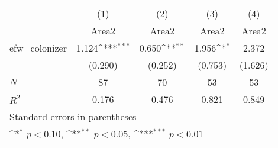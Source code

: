 {
\def\sym#1{\ifmmode^{#1}\else\(^{#1}\)\fi}
\begin{tabular}{l*{4}{c}}
\hline\hline
            &\multicolumn{1}{c}{(1)}&\multicolumn{1}{c}{(2)}&\multicolumn{1}{c}{(3)}&\multicolumn{1}{c}{(4)}\\
            &\multicolumn{1}{c}{Area2}&\multicolumn{1}{c}{Area2}&\multicolumn{1}{c}{Area2}&\multicolumn{1}{c}{Area2}\\
\hline
efw\_colonizer&       1.124\sym{***}&       0.650\sym{**} &       1.956\sym{*}  &       2.372         \\
            &     (0.290)         &     (0.252)         &     (0.753)         &     (1.626)         \\
\hline
\(N\)       &          87         &          70         &          53         &          53         \\
\(R^{2}\)   &       0.176         &       0.476         &       0.821         &       0.849         \\
\hline\hline
\multicolumn{5}{l}{\footnotesize Standard errors in parentheses}\\
\multicolumn{5}{l}{\footnotesize \sym{*} \(p<0.10\), \sym{**} \(p<0.05\), \sym{***} \(p<0.01\)}\\
\end{tabular}
}
